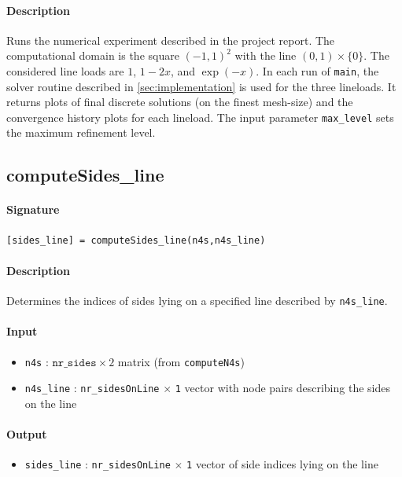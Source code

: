\documentclass[11pt,a4paper]{article}
\newcommand{\matrixdim}[2]{\texttt{#1} $\times$ \texttt{#2}}
\begin{document}
\paragraph{Description}
Runs the numerical experiment described in the project report. 
The computational domain is the square $(-1,1)^2$ with the line 
$(0,1) \times \{0\}$. 
The considered line loads are $1$, $1-2x$, and $\exp(-x)$. In each run of \texttt{main}, the solver routine described in \ref{sec:implementation} is used for the three lineloads. It returns plots of final discrete solutions (on the finest mesh-size) and the convergence history plots for each lineload. The input parameter \texttt{max\_level} sets the maximum refinement level. 


\subsection{computeSides\_line}

\paragraph{Signature}
\begin{verbatim}
[sides_line] = computeSides_line(n4s,n4s_line)
\end{verbatim}

\paragraph{Description}
Determines the indices of sides lying on a specified line described by 
\texttt{n4s\_line}.

\paragraph{Input}
\begin{itemize}
    \item \texttt{n4s} : $\texttt{nr\_sides} \times 2$ matrix (from \texttt{computeN4s})
    \item \texttt{n4s\_line} : \matrixdim{nr\_sidesOnLine}{1} vector with node pairs describing the sides on the line
\end{itemize}

\paragraph{Output}
\begin{itemize}
    \item \texttt{sides\_line} : \matrixdim{nr\_sidesOnLine}{1} vector of side indices lying on the line
\end{itemize}
\end{document}
